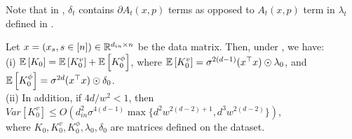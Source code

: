 Note that in , $\delta_t$ contains $\partial A_t(x,p)$ terms as opposed to $A_t(x,p)$ term in $\lambda_t$ defined in .
\begin{theorem}\label{th:main} Let $x=(x_s,s\in[n])\in \mathbb{R}^{d_{in}\times n}$ be the data matrix. Then, under , we have:\\
(i) $\mathbb{E}\left[K_0\right]=\mathbb{E}\left[K^v_0\right]+\mathbb{E}\left[K^{\phi}_0\right]$, where $\mathbb{E}\left[K^{v}_0\right]=\sigma^{2(d-1)} (x^\top x)\odot \lambda_0$, and $\mathbb{E}\left[K^{\phi}_0\right]=\sigma^{2d}  (x^\top x)\odot \delta_0$.\\
(ii) In addition, if ${4d}/{w^2}<1$, then $Var\left[K^v_0\right]\leq O\left(d^2_{in}\sigma^{4(d-1)}\max\{d^2w^{2(d-2)+1}, d^3w^{2(d-2)}\}\right)$,\\
where $K_0, K^v_0, K^{\phi}_0, \lambda_0, \delta_0$ are matrices defined on the dataset.
\end{theorem}

